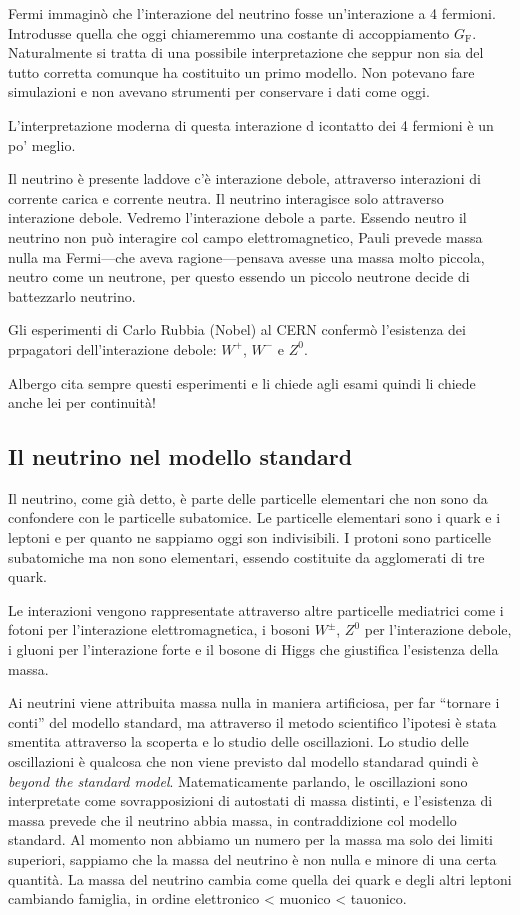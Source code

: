         Fermi immaginò che l'interazione del neutrino fosse un'interazione a 4 fermioni. Introdusse quella che oggi chiameremmo una costante di accoppiamento $G_\text{F}$. Naturalmente si tratta di una possibile interpretazione che seppur non sia del tutto corretta comunque ha costituito un primo modello. Non potevano fare simulazioni e non avevano strumenti per conservare i dati come oggi.

        L'interpretazione moderna di questa interazione d icontatto dei 4 fermioni è un po' meglio. 

        Il neutrino è presente laddove c'è interazione debole, attraverso interazioni di corrente carica e corrente neutra. Il neutrino interagisce solo attraverso interazione debole. Vedremo l'interazione debole a parte. Essendo neutro il neutrino non può interagire col campo elettromagnetico, Pauli prevede massa nulla ma Fermi---che aveva ragione---pensava avesse una massa molto piccola, neutro come un neutrone, per questo essendo un piccolo neutrone decide di battezzarlo neutrino.

        Gli esperimenti di Carlo Rubbia (Nobel) al CERN confermò l'esistenza dei prpagatori dell'interazione debole: $W^+$, $W^-$ e $Z^0$.

        Albergo cita sempre questi esperimenti e li chiede agli esami quindi li chiede anche lei per continuità!
    \subsection{Il neutrino nel modello standard}
        Il neutrino, come già detto, è parte delle particelle elementari che non sono da confondere con le particelle subatomice. Le particelle elementari sono i quark e i leptoni e per quanto ne sappiamo oggi son indivisibili. I protoni sono particelle subatomiche ma non sono elementari, essendo costituite da agglomerati di tre quark.

        Le interazioni vengono rappresentate attraverso altre particelle mediatrici come i fotoni per l'interazione elettromagnetica, i bosoni $W^\pm$, $Z^0$ per l'interazione debole, i gluoni per l'interazione forte e il bosone di Higgs che giustifica l'esistenza della massa.

        Ai neutrini viene attribuita massa nulla in maniera artificiosa, per far ``tornare i conti'' del modello standard, ma attraverso il metodo scientifico l'ipotesi è stata smentita attraverso la scoperta e lo studio delle oscillazioni. Lo studio delle oscillazioni è qualcosa che non viene previsto dal modello standarad quindi è \emph{beyond the standard model}. Matematicamente parlando, le oscillazioni sono interpretate come sovrapposizioni di autostati di massa distinti, e l'esistenza di massa prevede che il neutrino abbia massa, in contraddizione col modello standard. Al momento non abbiamo un numero per la massa ma solo dei limiti superiori, sappiamo che la massa del neutrino è non nulla e minore di una certa quantità. La massa del neutrino cambia come quella dei quark e degli altri leptoni cambiando famiglia, in ordine elettronico < muonico < tauonico.

